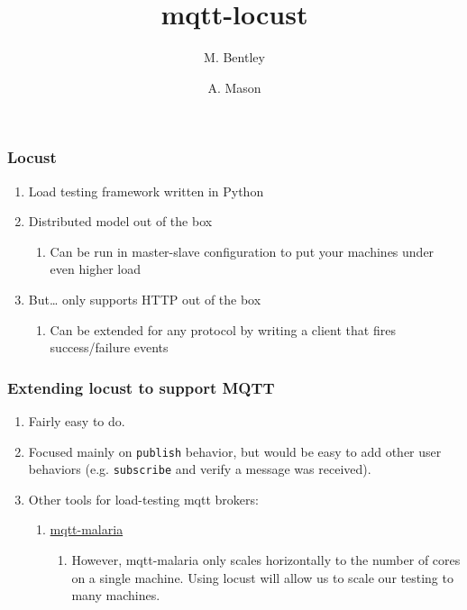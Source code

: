 \documentclass{beamer}
\title{mqtt-locust}
\author[Bentley, Mason]
{
    M. Bentley \and A. Mason\\
    \email{\{void,null\}@case.edu}
}
\institute[CWRU]{Case Western Reserve University}
\begin{document}
\frame{\titlepage}

\begin{frame}
    \frametitle{Locust}
    \begin{enumerate}
        \item Load testing framework written in Python
        \item
            Distributed model out of the box
            \begin{enumerate}
                \item Can be run in master-slave configuration to put your
                machines under even higher load
            \end{enumerate}
        \item
            But… only supports HTTP out of the box
            \begin{enumerate}
                \item Can be extended for any protocol by writing a client that
                fires success/failure events
            \end{enumerate}
    \end{enumerate}
\end{frame}

\begin{frame}
    \frametitle{Extending locust to support MQTT}
    \begin{enumerate}
        \item Fairly easy to do.
        \item Focused mainly on \texttt{publish} behavior, but would be easy to
        add other user behaviors (e.g. \texttt{subscribe} and verify a message
        was received).
        \item
            Other tools for load-testing mqtt brokers:
            \begin{enumerate}
                \item
                    \href{https://github.com/leandog/mqtt-malaria}{mqtt-malaria}
                    \begin{enumerate}
                        \item However, mqtt-malaria only scales horizontally to
                        the number of cores on a single machine. Using locust
                        will allow us to scale our testing to many machines.
                    \end{enumerate}
            \end{enumerate}
    \end{enumerate}
\end{frame}
\end{document}
